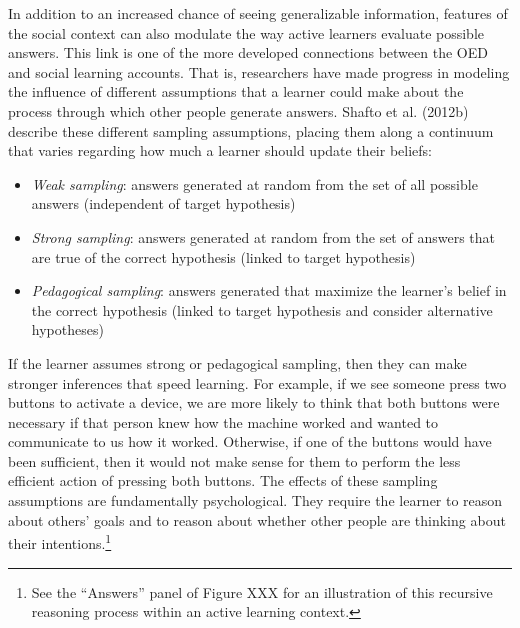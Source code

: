 \documentclass[oneside]{report}
\begin{document}
In addition to an increased chance of seeing generalizable information,
features of the social context can also modulate the way active learners
evaluate possible answers. This link is one of the more developed
connections between the OED and social learning accounts. That is,
researchers have made progress in modeling the influence of different
assumptions that a learner could make about the process through which
other people generate answers. Shafto et al. (2012b) describe these
different sampling assumptions, placing them along a continuum that
varies regarding how much a learner should update their beliefs:
\begin{itemize}
\tightlist
\item
  \emph{Weak sampling}: answers generated at random from the set of all
  possible answers (independent of target hypothesis)
\item
  \emph{Strong sampling}: answers generated at random from the set of
  answers that are true of the correct hypothesis (linked to target
  hypothesis)
\item
  \emph{Pedagogical sampling}: answers generated that maximize the
  learner's belief in the correct hypothesis (linked to target
  hypothesis and consider alternative hypotheses)
\end{itemize}
\noindent
If the learner assumes strong or pedagogical sampling, then they can
make stronger inferences that speed learning. For example, if we see
someone press two buttons to activate a device, we are more likely to
think that both buttons were necessary if that person knew how the
machine worked and wanted to communicate to us how it worked. Otherwise,
if one of the buttons would have been sufficient, then it would not make
sense for them to perform the less efficient action of pressing both
buttons. The effects of these sampling assumptions are fundamentally
psychological. They require the learner to reason about others' goals
and to reason about whether other people are thinking about their
intentions.\footnote{See the ``Answers'' panel of Figure XXX for an
  illustration of this recursive reasoning process within an active
  learning context.}
\end{document}
